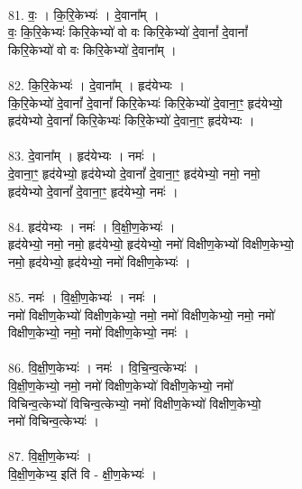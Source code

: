 \\
81. वः॒ । कि॒रि॒केभ्यः॑ । दे॒वाना᳚म् ।\\
वः॒ कि॒रि॒केभ्यः॑ किरि॒केभ्यो॑ वो वः किरि॒केभ्यो॑ दे॒वानां᳚ दे॒वानां᳚\\
किरि॒केभ्यो॑ वो वः किरि॒केभ्यो॑ दे॒वाना᳚म् ।\\
\\
82. कि॒रि॒केभ्यः॑ । दे॒वाना᳚म् । हृद॑येभ्यः ।\\
कि॒रि॒केभ्यो॑ दे॒वानां᳚ दे॒वानां᳚ किरि॒केभ्यः॑ किरि॒केभ्यो॑ दे॒वाना॒ꣳ॒ हृद॑येभ्यो॒\\
हृद॑येभ्यो दे॒वानां᳚ किरि॒केभ्यः॑ किरि॒केभ्यो॑ दे॒वाना॒ꣳ॒ हृद॑येभ्यः ।\\
\\
83. दे॒वाना᳚म् । हृद॑येभ्यः । नमः॑ ।\\
दे॒वाना॒ꣳ॒ हृद॑येभ्यो॒ हृद॑येभ्यो दे॒वानां᳚ दे॒वाना॒ꣳ॒ हृद॑येभ्यो॒ नमो॒ नमो॒\\
हृद॑येभ्यो दे॒वानां᳚ दे॒वाना॒ꣳ॒ हृद॑येभ्यो॒ नमः॑ ।\\
\\
84. हृद॑येभ्यः । नमः॑ । वि॒क्षी॒ण॒केभ्यः॑ ।\\
हृद॑येभ्यो॒ नमो॒ नमो॒ हृद॑येभ्यो॒ हृद॑येभ्यो॒ नमो॑ विक्षीण॒केभ्यो॑ विक्षीण॒केभ्यो॒\\
नमो॒ हृद॑येभ्यो॒ हृद॑येभ्यो॒ नमो॑ विक्षीण॒केभ्यः॑ ।\\
\\
85. नमः॑ । वि॒क्षी॒ण॒केभ्यः॑ । नमः॑ ।\\
नमो॑ विक्षीण॒केभ्यो॑ विक्षीण॒केभ्यो॒ नमो॒ नमो॑ विक्षीण॒केभ्यो॒ नमो॒ नमो॑\\
विक्षीण॒केभ्यो॒ नमो॒ नमो॑ विक्षीण॒केभ्यो॒ नमः॑ ।\\
\\
86. वि॒क्षी॒ण॒केभ्यः॑ । नमः॑ । वि॒चि॒न्व॒त्केभ्यः॑ ।\\
वि॒क्षी॒ण॒केभ्यो॒ नमो॒ नमो॑ विक्षीण॒केभ्यो॑ विक्षीण॒केभ्यो॒ नमो॑\\
विचिन्व॒त्केभ्यो॑ विचिन्व॒त्केभ्यो॒ नमो॑ विक्षीण॒केभ्यो॑ विक्षीण॒केभ्यो॒\\
नमो॑ विचिन्व॒त्केभ्यः॑ ।\\
\\
87. वि॒क्षी॒ण॒केभ्यः॑ ।\\
वि॒क्षी॒ण॒केभ्य॒ इति॑ वि - क्षी॒ण॒केभ्यः॑ ।\\
